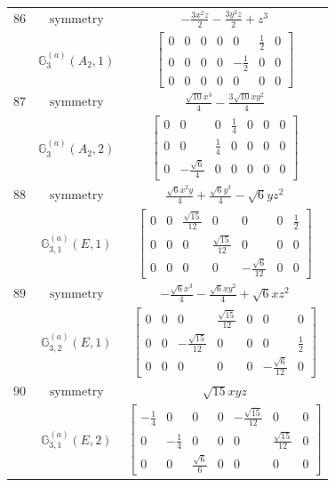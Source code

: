 \documentclass[fleqn,8pt,landscape]{jsarticle}
\begin{document}
\begin{longtable}{ccc}
$ 86 $ & $ \text{symmetry} $ & $ - \frac{3 x^{2} z}{2} - \frac{3 y^{2} z}{2} + z^{3} $ \\
$  $ & $ \mathbb{G}_{3}^{(a)}(A_{2},1) $ & $ \begin{bmatrix} 0 & 0 & 0 & 0 & 0 & \frac{1}{2} & 0 \\ 0 & 0 & 0 & 0 & - \frac{1}{2} & 0 & 0 \\ 0 & 0 & 0 & 0 & 0 & 0 & 0 \end{bmatrix} $ \\ \hline
$ 87 $ & $ \text{symmetry} $ & $ \frac{\sqrt{10} x^{3}}{4} - \frac{3 \sqrt{10} x y^{2}}{4} $ \\
$  $ & $ \mathbb{G}_{3}^{(a)}(A_{2},2) $ & $ \begin{bmatrix} 0 & 0 & 0 & \frac{1}{4} & 0 & 0 & 0 \\ 0 & 0 & \frac{1}{4} & 0 & 0 & 0 & 0 \\ 0 & - \frac{\sqrt{6}}{4} & 0 & 0 & 0 & 0 & 0 \end{bmatrix} $ \\ \hline
$ 88 $ & $ \text{symmetry} $ & $ \frac{\sqrt{6} x^{2} y}{4} + \frac{\sqrt{6} y^{3}}{4} - \sqrt{6} y z^{2} $ \\
$  $ & $ \mathbb{G}_{3,1}^{(a)}(E,1) $ & $ \begin{bmatrix} 0 & 0 & \frac{\sqrt{15}}{12} & 0 & 0 & 0 & \frac{1}{2} \\ 0 & 0 & 0 & \frac{\sqrt{15}}{12} & 0 & 0 & 0 \\ 0 & 0 & 0 & 0 & - \frac{\sqrt{6}}{12} & 0 & 0 \end{bmatrix} $ \\ \hline
$ 89 $ & $ \text{symmetry} $ & $ - \frac{\sqrt{6} x^{3}}{4} - \frac{\sqrt{6} x y^{2}}{4} + \sqrt{6} x z^{2} $ \\
$  $ & $ \mathbb{G}_{3,2}^{(a)}(E,1) $ & $ \begin{bmatrix} 0 & 0 & 0 & \frac{\sqrt{15}}{12} & 0 & 0 & 0 \\ 0 & 0 & - \frac{\sqrt{15}}{12} & 0 & 0 & 0 & \frac{1}{2} \\ 0 & 0 & 0 & 0 & 0 & - \frac{\sqrt{6}}{12} & 0 \end{bmatrix} $ \\ \hline
$ 90 $ & $ \text{symmetry} $ & $ \sqrt{15} x y z $ \\
$  $ & $ \mathbb{G}_{3,1}^{(a)}(E,2) $ & $ \begin{bmatrix} - \frac{1}{4} & 0 & 0 & 0 & - \frac{\sqrt{15}}{12} & 0 & 0 \\ 0 & - \frac{1}{4} & 0 & 0 & 0 & \frac{\sqrt{15}}{12} & 0 \\ 0 & 0 & \frac{\sqrt{6}}{6} & 0 & 0 & 0 & 0 \end{bmatrix} $ \\ \hline

\end{longtable}
\end{document}
